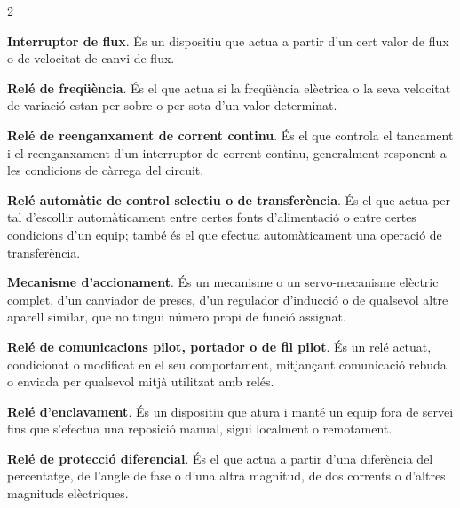 \begin{multicols}{2}
\begin{list}{}
		\item[\textbf{80}]   
		\textbf{Interruptor de flux}. És un dispositiu que actua a partir d'un cert valor de flux o de velocitat de canvi de flux.
		
		\item[\textbf{81}]   
		\textbf{Relé de freqüència}. És el que actua
		si la freqüència elèctrica o la seva velocitat de variació estan per sobre o per sota d'un valor determinat.
		
		\item[\textbf{82}]   
		\textbf{Relé de reenganxament de corrent continu}. És el que controla el tancament i el reenganxament d'un
		interruptor de corrent continu, generalment responent a les condicions de càrrega del
		circuit.
		
		\item[\textbf{83}]  
		\textbf{Relé automàtic de control selectiu o de transferència}. És
		el que actua per tal d'escollir automàticament entre certes fonts
		d'alimentació o entre certes condicions d'un equip; també és el que
		efectua automàticament una operació de transferència.
		
		\item[\textbf{84}]   
		\textbf{Mecanisme d'accionament}. És un
		mecanisme o un servo-mecanisme elèctric complet,  d'un canviador de
		preses, d'un regulador d'inducció o de qualsevol altre aparell
		similar, que no tingui número propi de funció assignat.
		
		\item[\textbf{85}]   
		\textbf{Relé de comunicacions pilot, portador o de fil pilot}. És un relé actuat, condicionat o modificat en el seu comportament, mitjançant comunicació rebuda o enviada per qualsevol mitjà utilitzat amb relés.
		
		\item[\textbf{86}]   
		\textbf{Relé d'enclavament}. És un dispositiu que atura i manté un equip fora de servei fins que s'efectua una reposició manual, sigui localment o remotament.
		
		\item[\textbf{87}]   
		\textbf{Relé de protecció diferencial}. És el que actua a partir d'una diferència  del percentatge, de l'angle de fase o d'una altra magnitud, de dos corrents
		o d'altres magnituds elèctriques.
		

\end{list}
\end{multicols}
